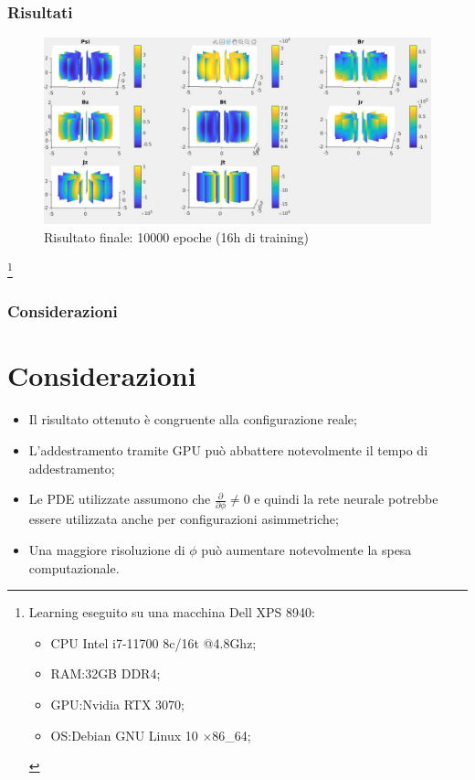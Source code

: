 \documentclass{beamer}
\begin{document}
\begin{frame}
	\frametitle{Risultati}
	\begin{figure}
		\includegraphics[scale=0.26]{2022-06-20-23-07-41.png}%
		\caption{Risultato finale: 10000 epoche (16h di training)}%
	\end{figure}
	\vspace{-1cm}
\footnote{\scriptsize
Learning eseguito su una macchina Dell XPS 8940:\\
		\begin{itemize}
			\item CPU Intel i7-11700 8c/16t @4.8Ghz;%
			\item RAM:32GB DDR4;
			\item GPU:Nvidia RTX 3070;%
			\item OS:Debian GNU Linux 10 \(\times \)86\_64;%
		\end{itemize}
}
\end{frame}
\begin{frame}
	\frametitle{Considerazioni}
	\section{Considerazioni}
	\begin{itemize}
		\item Il risultato ottenuto è congruente alla configurazione reale;
		\item L'addestramento tramite GPU può abbattere notevolmente il tempo di addestramento;
		\item Le PDE utilizzate assumono che \(\frac{\partial}{\partial\phi }\neq 0\) e quindi la rete neurale potrebbe essere utilizzata anche per configurazioni asimmetriche;
		\item Una maggiore risoluzione di \(\phi \) può aumentare notevolmente la spesa computazionale.
	\end{itemize}
\end{frame}
\end{document}
